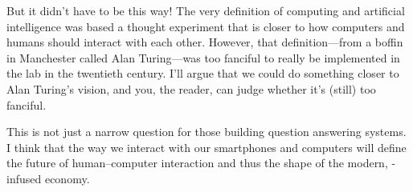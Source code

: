 But it didn't have to be this way!
%
The very definition of computing and artificial intelligence was based a
thought experiment that is closer to how computers and humans should interact
with each other.
%
However, that definition---from a boffin in Manchester called Alan
Turing---was too fanciful to really be implemented in the lab in the
twentieth century.
%
I'll argue that we could do something closer to Alan Turing's vision,
and you, the reader, can judge whether it's (still) too fanciful.

This is not just a narrow question for those building question
answering systems.
%
I think that the way we interact with our smartphones and computers
will define the future of human--computer interaction and
thus the shape of the modern, -infused economy.


